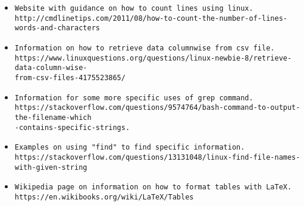 \documentclass[9pt]{article}
\begin{document}
\begin{itemize}
    \item{\texttt{Website with guidance on how to count lines using linux.}\\
\texttt{http://cmdlinetips.com/2011/08/how-to-count-the-number-of-lines-words-and-characters}\\
}
 \item{\texttt{Information on how to retrieve data columnwise from csv file.}\\
 \texttt{https://www.linuxquestions.org/questions/linux-newbie-8/retrieve-data-column-wise-\\
 from-csv-files-4175523865/}}
 \item{\texttt{Information for some more specific uses of grep command.}\\
 \texttt{https://stackoverflow.com/questions/9574764/bash-command-to-output-the-filename-which\\
  -contains-specific-strings.}\\}
 \item{\texttt{Examples on using "find" to find specific information.\\}
 \texttt{https://stackoverflow.com/questions/13131048/linux-find-file-names-with-given-string}\\}
 \item{\texttt{Wikipedia page on information on how to format tables with LaTeX.\\}
 \texttt{https://en.wikibooks.org/wiki/LaTeX/Tables}\\}

\end{itemize}
\end{document}
